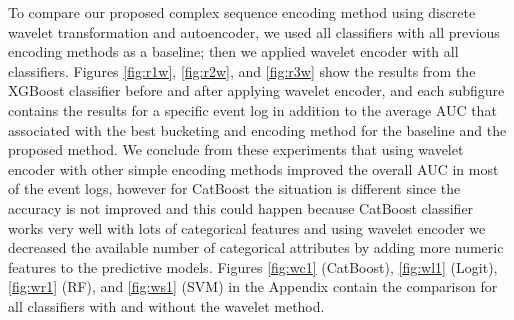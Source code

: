 
To compare our proposed complex sequence encoding method using discrete wavelet transformation and autoencoder, we used all classifiers with all previous encoding methods as a baseline; then we applied wavelet encoder with all classifiers. Figures \ref{fig:r1w}, \ref{fig:r2w}, and \ref{fig:r3w} show the results from the XGBoost classifier before and after applying wavelet encoder, and each subfigure contains the results for a specific event log in addition to the average AUC that associated with the best bucketing and encoding method for the baseline and the proposed method. We conclude from these experiments that using wavelet encoder with other simple encoding methods improved the overall AUC in most of the event logs, however for CatBoost the situation is different since the accuracy is not improved and this could happen because CatBoost classifier works very well with lots of categorical features and using wavelet encoder we decreased the available number of categorical attributes by adding more numeric features to the predictive models. Figures \ref{fig:wc1} (CatBoost), \ref{fig:wl1} (Logit), \ref{fig:wr1} (RF), and \ref{fig:ws1} (SVM) in the Appendix contain the comparison for all classifiers with and without the wavelet method. 






